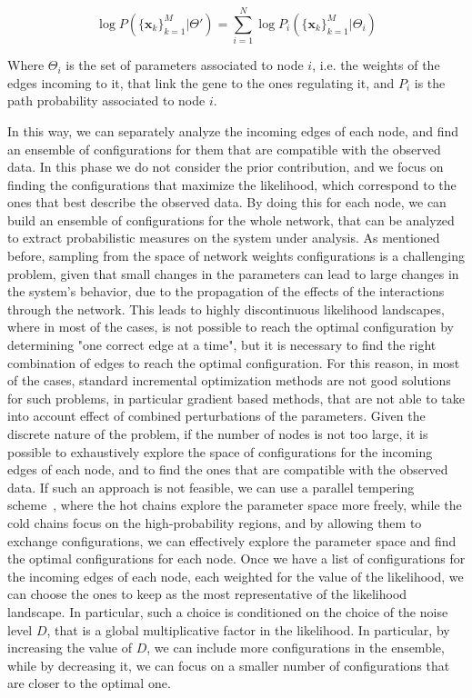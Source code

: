 \documentclass[10pt, aps, rmp,  twocolumn, superscriptaddress, floatfix, showkeys]{revtex4-2}
\begin{document}
\begin{equation}
    \log P(\{\mathbf{x}_k\}_{k=1}^M|\Theta')=\sum_{i=1}^N \log P_i(\{\mathbf{x}_k\}_{k=1}^M|\Theta_i)
    \label{eq:logloss}
\end{equation}

Where $\Theta_i$ is the set of parameters associated to node $i$, i.e. the weights of the edges incoming to it, that link the gene to the ones regulating it, and $P_i$ is the path probability associated to node $i$.

In this way, we can separately analyze the incoming edges of each node, and find an ensemble of configurations for them that are compatible with the observed data. In this phase we do not consider the prior contribution, and we focus on finding the configurations that maximize the likelihood, which correspond to the ones that best describe the observed data. By doing this for each node, we can build an ensemble of configurations for the whole network, that can be analyzed to extract probabilistic measures on the system under analysis.
As mentioned before, sampling from the space of network weights configurations is a challenging problem, given that small changes in the parameters can lead to large changes in the system's behavior, due to the propagation of the effects of the interactions through the network. This leads to highly discontinuous likelihood landscapes, where in most of the cases, is not possible to reach the optimal configuration by determining "one correct edge at a time", but it is necessary to find the right combination of edges to reach the optimal configuration. For this reason, in most of the cases, standard incremental optimization methods are not good solutions for such problems, in particular gradient based methods, that are not able to take into account effect of combined perturbations of the parameters. Given the discrete nature of the problem, if the number of nodes is not too large, it is possible to exhaustively explore the space of configurations for the incoming edges of each node, and to find the ones that are compatible with the observed data.
If such an approach is not feasible, we can use a parallel tempering scheme~\cite{hukushima1996exchange}, where the hot chains explore the parameter space more freely, while the cold chains focus on the high-probability regions, and by allowing them to exchange configurations, we can effectively explore the parameter space and find the optimal configurations for each node.
Once we have a list of configurations for the incoming edges of each node, each weighted for the value of the likelihood, we can choose the ones to keep as the most representative of the likelihood landscape. In particular, such a choice is conditioned on the choice of the noise level $D$, that is a global multiplicative factor in the likelihood. In particular, by increasing the value of $D$, we can include more configurations in the ensemble, while by decreasing it, we can focus on a smaller number of configurations that are closer to the optimal one.
\end{document}

